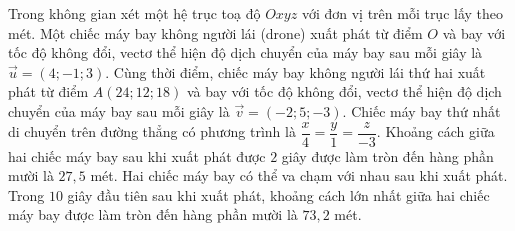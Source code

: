 \begin{ex}
Trong không gian xét một hệ trục toạ độ $Oxyz$ với đơn vị trên mỗi trục lấy theo mét. Một chiếc máy bay không người lái (drone) xuất phát từ điểm $O$ và bay với tốc độ không đổi, vectơ thể hiện độ dịch chuyển của máy bay sau mỗi giây là $\vec u=(4;-1;3)$. Cùng thời điểm, chiếc máy bay không người lái thứ hai xuất phát từ điểm $A(24;12;18)$ và bay với tốc độ không đổi, vectơ thể hiện độ dịch chuyển của máy bay sau mỗi giây là $\vec v=(-2;5;-3)$.
\choiceTF
{Chiếc máy bay thứ nhất di chuyển trên đường thẳng có phương trình là $\dfrac x4=\dfrac y1=\dfrac z{-3}$.}
{\True Khoảng cách giữa hai chiếc máy bay sau khi xuất phát được $2$ giây được làm tròn đến hàng phần mười là $27{,}5$ mét.}
{Hai chiếc máy bay có thể va chạm với nhau sau khi xuất phát.}
{Trong $10$ giây đầu tiên sau khi xuất phát, khoảng cách lớn nhất giữa hai chiếc máy bay được làm tròn đến hàng phần mười là $73{,}2$ mét.}
\end{ex}
